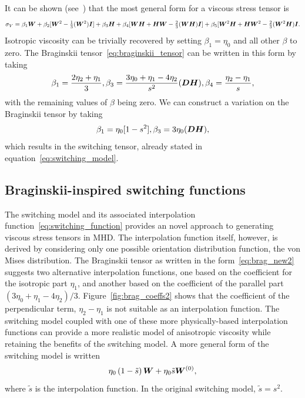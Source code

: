 It can be shown (see~\cite{mactaggartBraginskiiMagnetohydrodynamicsArbitrary2017}) that the most general form for a viscous stress tensor is
\begin{equation}
  \label{eq:general_viscous_stress_tensor}
\sigma_V = \beta_1 {\bm W} + \beta_2 [ {\bm W}^2 - \tfrac{1}{3} ({\bm W}^2){\bm I}]\\
+ \beta_3 {\bm H} + \beta_4 [ {\bm W} {\bm H} + {\bm H} {\bm W} - \tfrac{2}{3} ( {\bm W} {\bm H}) {\bm I}]\\
+ \beta_5 [ {\bm W}^2 {\bm H} + {\bm H} {\bm W}^2 - \tfrac{2}{3} ( {\bm W}^2 {\bm H} ) {\bm I}.
\end{equation}
Isotropic viscosity can be trivially recovered by setting $\beta_1 = \eta_0$ and all other $\beta$ to zero. The Braginskii tensor~\ref{eq:braginskii_tensor} can be written in this form by taking
\begin{equation}
  \label{eq:brag_betas}
\beta_1 = \frac{2 \eta_2 + \eta_1}{3},\\
\beta_3 = \frac{3 \eta_0 + \eta_1 - 4\eta_2}{s^2}  ({\bm D}{\bm H}),\\
\beta_4 = \frac{\eta_2 - \eta_1}{s},
\end{equation}
with the remaining values of $\beta$ being zero. We can construct a variation on the Braginskii tensor by taking
\begin{equation}
  \label{eq:switching_betas}
\beta_1 = \eta_0 [1 - s^2],\\
\beta_3 = 3 \eta_0 ({\bm D} {\bm H}),
\end{equation}
which results in the switching tensor, already stated in equation~\ref{eq:switching_model}.

\subsection{Braginskii-inspired switching functions}

The switching model and its associated interpolation function~\ref{eq:switching_function} provides an novel approach to generating viscous stress tensors in MHD. The interpolation function itself, however, is derived by considering only one possible orientation distribution function, the von Mises distribution. The Braginskii tensor as written in the form~\ref{eq:brag_new2} suggests two alternative interpolation functions, one based on the coefficient for the isotropic part $\eta_1$, and another based on the coefficient of the parallel part $(3\eta_0+\eta_1-4\eta_2)/3$. Figure~\ref{fig:brag_coeffs2} shows that the coefficient of the perpendicular term, $\eta_2 - \eta_1$ is not suitable as an interpolation function. The switching model coupled with one of these more physically-based interpolation functions can provide a more realistic model of anisotropic viscosity while retaining the benefits of the switching model. A more general form of the switching model is written
\begin{equation}
  \label{eq:general_switching_model}
\eta_0 \left( 1 - \tilde{s} \right) {\bm W} + \eta_0 \tilde{s}{\bm W}^{(0)},
\end{equation}
where $\tilde{s}$ is the interpolation function. In the original switching model, $\tilde{s} = s^2$.

